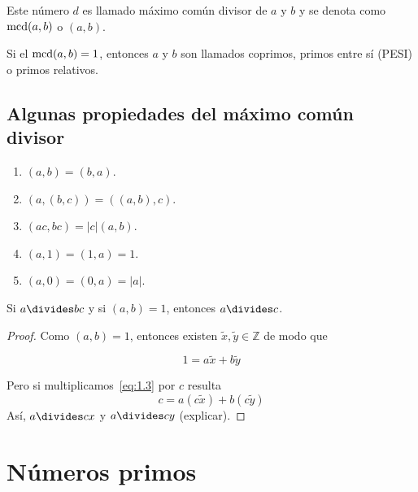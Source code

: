 \documentclass[oneside,a5paper]{memoir}
\begin{document}
\begin{definition}
Este número $d$ es llamado máximo común divisor de $a$ y $b$ y se denota como $\operatorname{mcd}(a,b)$ o $(a,b)$.
\end{definition}

\begin{remark}
Si el $\operatorname{mcd}(a,b)=1$, entonces $a$ y $b$ son llamados coprimos, primos entre sí (PESI) o primos relativos.
\end{remark}

\subsection{Algunas propiedades del máximo común divisor}

\begin{enumerate}[font={\bfseries},label={\arabic*)}]

\item $(a,b)=(b,a)$.

\item $(a,(b,c))=((a,b),c)$.

\item $(ac,bc)=|c|(a,b)$.

\item $(a,1)=(1,a)=1$.

\item $(a,0)=(0,a)=|a|$.
\end{enumerate}

\begin{theorem}

Si $a\divides bc$ y si $(a,b)=1$, entonces $a\divides c$.
\begin{proof}
Como $(a,b)=1$, entonces existen $\tilde{x},\tilde{y}\in\mathbb{Z}$ de modo que

\begin{equation}\label{eq:1.3}
1=a\tilde{x}+b\tilde{y}
\end{equation}

\noindent
Pero si multiplicamos~\eqref{eq:1.3} por $c$ resulta
\begin{equation}
c=a(c\tilde{x})+b(c\tilde{y})
\end{equation}
Así, $a\divides cx$ y $a\divides cy$ (explicar).

\end{proof}

\end{theorem}

\section{Números primos}
\end{document}
